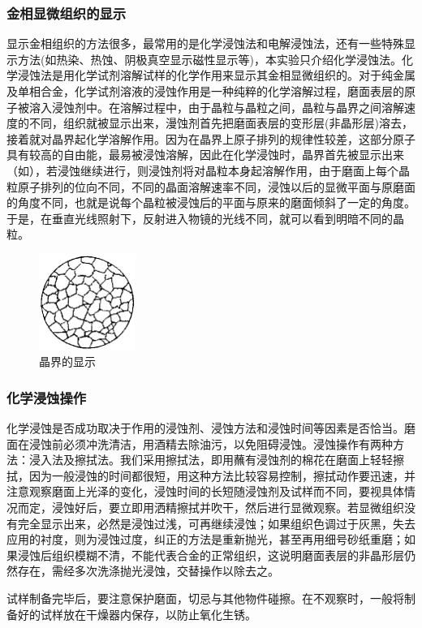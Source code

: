 \documentclass[a4paper,utf8]{article}
\begin{document}
        \subsubsection{金相显微组织的显示}
        显示金相组织的方法很多，最常用的是化学浸蚀法和电解浸蚀法，还有一些特殊显示方法(如热染、热蚀、阴极真空显示磁性显示等)，本实验只介绍化学浸蚀法。化学浸蚀法是用化学试剂溶解试样的化学作用来显示其金相显微组织的。对于纯金属及单相合金，化学试剂溶液的浸蚀作用是一种纯粹的化学溶解过程，磨面表层的原子被溶入浸蚀剂中。在溶解过程中，由于晶粒与晶粒之间，晶粒与晶界之间溶解速度的不同，组织就被显示出来，漫蚀剂首先把磨面表层的变形层(非晶形层)溶去，接着就对晶界起化学溶解作用。因为在晶界上原子排列的规律性较差，这部分原子具有较高的自由能，最易被浸蚀溶解，因此在化学浸蚀时，晶界首先被显示出来（如），若浸蚀继续进行，则浸蚀剂将对晶粒本身起溶解作用，由于磨面上每个晶粒原子排列的位向不同，不同的晶面溶解速率不同，浸蚀以后的显微平面与原磨面的角度不同，也就是说每个晶粒被浸蚀后的平面与原来的磨面倾斜了一定的角度。于是，在垂直光线照射下，反射进入物镜的光线不同，就可以看到明暗不同的晶粒。
        \begin{figure}[!ht]
            \caption{晶界的显示\label{fig:jingjie}}
            \includegraphics[width=0.28\textwidth]{jingjie.png}
        \end{figure}
        \subsubsection{化学浸蚀操作}
        化学浸蚀是否成功取决于作用的浸蚀剂、浸蚀方法和浸蚀时间等因素是否恰当。磨面在浸蚀前必须冲洗清洁，用酒精去除油污，以免阻碍浸蚀。浸蚀操作有两种方法：浸入法及擦拭法。我们采用擦拭法，即用蘸有浸蚀剂的棉花在磨面上轻轻擦拭，因为一般浸蚀的时间都很短，用这种方法比较容易控制，擦拭动作要迅速，并注意观察磨面上光泽的变化，浸蚀时间的长短随浸蚀剂及试样而不同，要视具体情况而定，浸蚀好后，要立即用洒精擦拭并吹干，然后进行显微观察。若显微组织没有完全显示出来，必然是浸蚀过浅，可再继续浸蚀；如果组织色调过于灰黑，失去应用的衬度，则为浸蚀过度，纠正的方法是重新抛光，甚至再用细号砂纸重磨；如果浸蚀后组织模糊不清，不能代表合金的正常组织，这说明磨面表层的非晶形层仍然存在，需经多次洗涤抛光浸蚀，交替操作以除去之。\par
        试样制备完毕后，要注意保护磨面，切忌与其他物件碰擦。在不观察时，一般将制备好的试样放在干燥器内保存，以防止氧化生锈。
\end{document}
